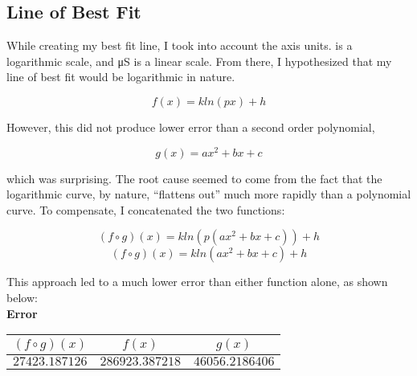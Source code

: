 \documentclass[a4paper]{article}
\newcommand{\pH}{\text{pH}}
\begin{document}
        \subsection{Line of Best Fit}
            \begin{center}
                While creating my best fit line, I took into account the axis units.
                \pH{} is a logarithmic scale, and \si{\micro\siemens} is a linear
                scale. From there, I hypothesized that my line of best fit would be
                logarithmic in nature.
            \end{center}
            \begin{equation}
                f(x)=kln(px)+h
            \end{equation}
            \centerline{However, this did not produce lower error than a second order polynomial,}
            \begin{equation}
                g(x)=ax^2+bx+c
            \end{equation}
            \begin{center}
                which was surprising. The root cause seemed to come from the fact that
                the logarithmic curve, by nature, ``flattens out'' much more rapidly
                than a polynomial curve. To compensate, I concatenated the two functions:
            \end{center}
            \begin{equation}
                (f\circ g)(x)=kln(p(ax^2+bx+c))+h
            \end{equation}
            \begin{equation}
                (f\circ g)(x)=kln(ax^2+bx+c)+h
            \end{equation}
            \begin{center}
                This approach led to a much lower error than either function alone,
                as shown below:
                \\
                \bf{Error}
                \\
                \begin{tabular}{|c|c|c|}
                    \hline
                    $(f\circ g)(x)$ & $f(x)$ & $g(x)$
                    \\\hline
                    $27423.187126$ & $286923.387218$ & $46056.2186406$
                    \\\hline
                \end{tabular}
            \end{center}
\end{document}
